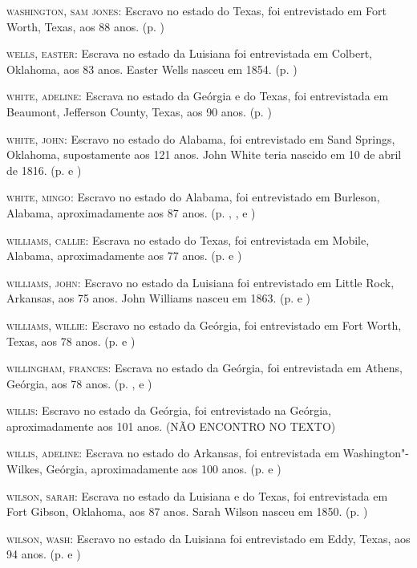 \begin{Parskip}
\textsc{washington, sam jones:} Escravo no estado do Texas, foi
entrevistado em Fort Worth, Texas, aos 88 anos. (p. \pageref{ref280})

\textsc{wells, easter:} Escrava no estado da Luisiana foi entrevistada
em Colbert, Oklahoma, aos 83 anos. Easter Wells nasceu em 1854. (p. \pageref{ref281})

\textsc{white, adeline:} Escrava no estado da Geórgia e do Texas, foi
entrevistada em Beaumont, Jefferson County, Texas, aos 90 anos. (p. \pageref{ref282})

\textsc{white, john:} Escravo no estado do Alabama, foi entrevistado em
Sand Springs, Oklahoma, supostamente aos 121 anos. John White teria
nascido em 10 de abril de 1816. (p. \pageref{ref283} e \pageref{ref284})

\textsc{white, mingo:} Escravo no estado do Alabama, foi entrevistado em
Burleson, Alabama, aproximadamente aos 87 anos. (p. \pageref{ref285}, \pageref{ref286}, \pageref{ref287} e \pageref{ref288})

\textsc{williams, callie:} Escrava no estado do Texas, foi entrevistada
em Mobile, Alabama, aproximadamente aos 77 anos. (p. \pageref{ref289} e \pageref{ref290})

\textsc{williams, john:} Escravo no estado da Luisiana foi entrevistado
em Little Rock, Arkansas, aos 75 anos. John Williams nasceu em 1863. (p. \pageref{ref291} e \pageref{ref292})

\textsc{williams, willie:} Escravo no estado da Geórgia, foi
entrevistado em Fort Worth, Texas, aos 78 anos. (p. \pageref{ref293} e \pageref{ref294})

\textsc{willingham, frances:} Escrava no estado da Geórgia, foi
entrevistada em Athens, Geórgia, aos 78 anos. (p. \pageref{ref295}, \pageref{ref296} e \pageref{ref297})

\textsc{willis:} Escravo no estado da Geórgia, foi entrevistado na
Geórgia, aproximadamente aos 101 anos. (NÃO ENCONTRO NO TEXTO)

\textsc{willis, adeline:} Escrava no estado do Arkansas, foi
entrevistada em Washington"-Wilkes, Geórgia, aproximadamente aos 100
anos. (p. \pageref{ref298} e \pageref{ref299})

\textsc{wilson, sarah:} Escrava no estado da Luisiana e do Texas, foi
entrevistada em Fort Gibson, Oklahoma, aos 87 anos. Sarah Wilson nasceu
em 1850. (p. \pageref{ref300})

\textsc{wilson, wash:} Escravo no estado da Luisiana foi entrevistado em
Eddy, Texas, aos 94 anos. (p. \pageref{ref301} e \pageref{ref302})


\end{Parskip}
